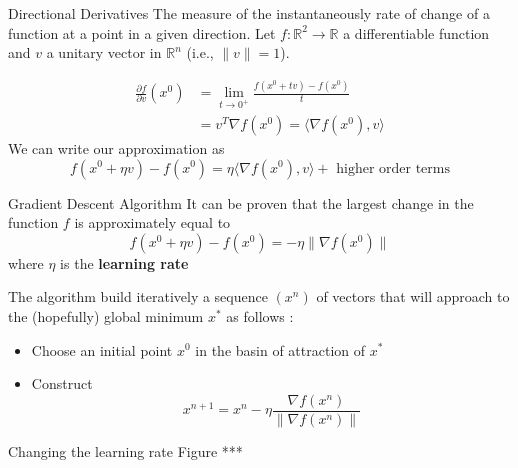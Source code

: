 \documentclass{beamer}
\begin{document}
\begin{frame}{Directional Derivatives}
	The measure of the instantaneously rate of change of a function at a point in a given direction. 
	Let $f\colon \mathbb{R}^2 \to \mathbb{R}$ a differentiable function and $v$ a unitary vector in $\mathbb{R}^n$ (i.e., $\|v\|=1$). 

\begin{equation*}
	\begin{split}
		\frac{\partial f}{\partial v}(x^0)& = \lim_{t \to 0^+}\frac{f(x^0+tv)-f(x^0)}{t}\\
		&= v^T \nabla f(x^0) = \langle \nabla f(x^0), v \rangle
	\end{split}
\end{equation*}
We can write our approximation as
\begin{equation*}
	f(x^0+ \eta v)-f(x^0)= \eta \langle \nabla f(x^0), v \rangle + \text{ higher order terms}
\end{equation*}

\end{frame}

\begin{frame}{Gradient Descent Algorithm}
	It can be proven that the largest change in the function $f$ is approximately equal to 
	\begin{equation*}
		f(x^0+ \eta v)-f(x^0)= -\eta  \| \nabla f(x^0)\| 
	\end{equation*}
where $\eta$ is the \textbf{learning rate}

The algorithm build iteratively a sequence $(x^n)$ of vectors that will approach to the (hopefully) global minimum $x^*$ as follows :
\begin{itemize}
	\item Choose an initial point $x^0$ in the basin of attraction of  $x^*$
	\item Construct 
	\begin{equation*}
		x^{n+1}= x^n - \eta \frac{\nabla f(x^n)}{\| \nabla f(x^n)\|}
	\end{equation*} 
\end{itemize}
\end{frame}

\begin{frame}{Changing the learning rate}
	Figure ***
\end{frame}
\end{document}
